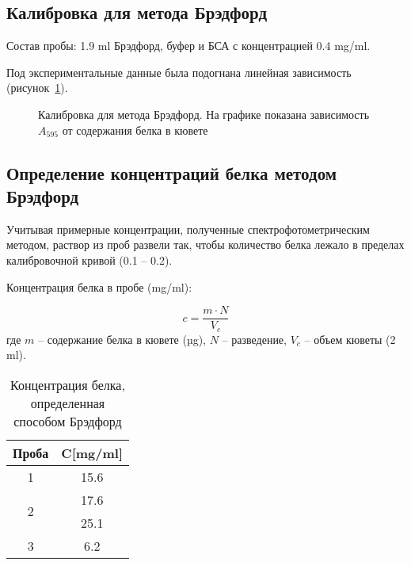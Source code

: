 \subsection{Калибровка для метода Брэдфорд}
\label{A0k}

Состав пробы: 1.9 ml Брэдфорд, буфер и БСА с концентрацией 0.4 mg/ml.

Под экспериментальные данные была подогнана линейная зависимость
(рисунок~\ref{fig-calibration}).

\begin{figure}[htbp]

\caption{Калибровка для метода Брэдфорд.
    На графике показана зависимость $A_{595}$ от содержания белка в кювете}
\label{fig-calibration}
\end{figure}

\subsection{Определение концентраций белка методом Брэдфорд}

Учитывая примерные концентрации, полученные спектрофотометрическим методом,
раствор из проб развели так, чтобы количество белка лежало в пределах
калибровочной кривой (0.1 -- 0.2).

Концентрация белка в пробе (mg/ml):

$$ c = \frac{m \cdot N}{V_c} $$
где $m$ -- содержание белка в кювете (µg),
$N$ -- разведение,
$V_c$ -- объем кюветы (2 ml).

\begin{table}[htbp]
\caption{Концентрация белка, определенная способом Брэдфорд}
\begin{tabular}{|c|c|}
\hline
Проба & C[mg/ml] \\
\hline
1 & 15.6 \\
\hline
\multirow{2}{*}{2} & 17.6 \\
& 25.1 \\
\hline
3 & 6.2 \\
\hline
\end{tabular}
\label{table-bredford}
\end{table}

